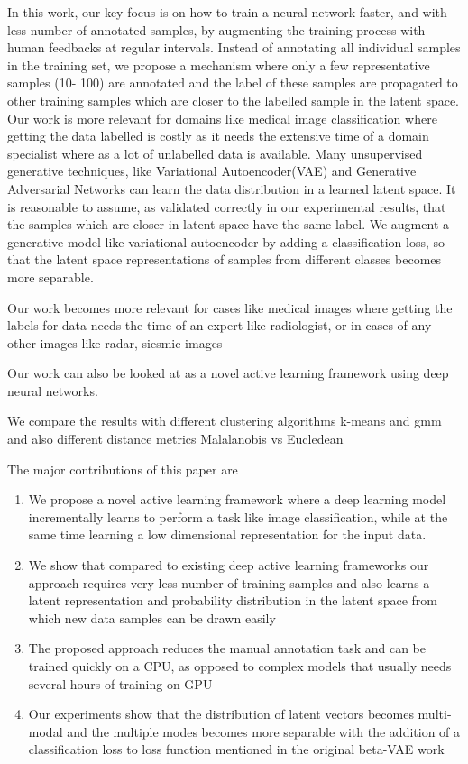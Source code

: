 \documentclass[runningheads]{llncs}
\begin{document}
In this work, our key focus is on how to train a neural network faster, and with less number of annotated samples, by augmenting the training process with human feedbacks at regular intervals.
Instead of annotating all individual samples in the training set, we propose a mechanism where only a few representative samples (10- 100) are annotated and the label of these samples are propagated to other training samples  which are closer to the labelled sample in the latent space.
Our work is more relevant for  domains like medical image classification where  getting the data labelled is costly as it needs the extensive time of a domain specialist where as a lot of unlabelled data is available.
Many unsupervised generative techniques, like Variational Autoencoder(VAE) \cite{vae} and Generative Adversarial Networks \cite{gan} can learn the data distribution in a learned latent space.
It is reasonable to assume, as validated correctly in our experimental results, that the samples which are closer in latent space have the same label.
We augment a generative model like variational autoencoder by adding a classification loss, so that the latent space representations of samples from different classes becomes more separable.


Our work becomes more relevant for cases like medical images where getting the labels for data needs the time of an expert like radiologist, or in cases of any other images like radar, siesmic images


Our work can also be looked at  as a novel  active learning framework using deep neural networks.

We compare the results with different clustering algorithms k-means and gmm and also different distance metrics Malalanobis vs Eucledean

The major contributions of this paper are
\begin{enumerate}
    \item We propose a novel active learning framework where a  deep learning model incrementally learns to perform a task like image classification, while at the same time learning a low dimensional representation for the input data.
    \item We show that compared to existing deep active learning frameworks our approach requires very less number of training samples and also learns a latent representation and  probability distribution in the latent space from which new data samples can be drawn easily
    \item The proposed approach reduces the manual annotation task and can be trained quickly on a CPU, as opposed to complex models that usually needs several hours of training on GPU
    \item Our experiments show that the distribution of latent vectors becomes multi-modal  and the multiple modes becomes more separable with the addition of a classification loss to  loss function mentioned in the original beta-VAE work \cite{beta_vae}
\end{enumerate}
\end{document}

